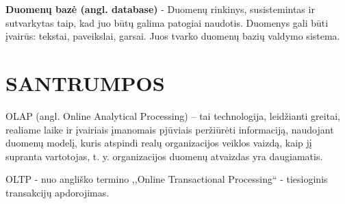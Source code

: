\documentclass[12pt,a4paper,titlepage]{article}
\begin{document}
\textbf{Duomenų bazė (angl. database)} - Duomenų rinkinys, susistemintas ir sutvarkytas taip, kad juo būtų galima patogiai naudotis. Duomenys gali būti įvairūs: tekstai, paveikslai, garsai. Juos tvarko duomenų bazių valdymo sistema.

\section*{SANTRUMPOS}

OLAP (angl. Online Analytical Processing) – tai technologija, leidžianti greitai, realiame laike ir įvairiais įmanomais pjūviais peržiūrėti informaciją, naudojant duomenų modelį, kuris atspindi realų organizacijos veiklos vaizdą, kaip jį supranta vartotojas, t. y. organizacijos duomenų atvaizdas yra daugiamatis.

OLTP - nuo angliško termino ,,Online Transactional Processing`` - tiesioginis transakcijų apdorojimas.
\end{document}
